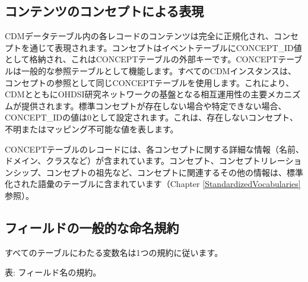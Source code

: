 \documentclass[
  11pt]{book}
\theoremstyle{definition}
\theoremstyle{definition}
\theoremstyle{definition}
\theoremstyle{definition}
\theoremstyle{remark}
\begin{document}
\subsection{コンテンツのコンセプトによる表現}\label{ux30b3ux30f3ux30c6ux30f3ux30c4ux306eux30b3ux30f3ux30bbux30d7ux30c8ux306bux3088ux308bux8868ux73fe}

CDMデータテーブル内の各レコードのコンテンツは完全に正規化され、コンセプトを通じて表現されます。コンセプトはイベントテーブルにCONCEPT\_ID値として格納され、これはCONCEPTテーブルの外部キーです。CONCEPTテーブルは一般的な参照テーブルとして機能します。すべてのCDMインスタンスは、コンセプトの参照として同じCONCEPTテーブルを使用します。これにより、CDMとともにOHDSI研究ネットワークの基盤となる相互運用性の主要メカニズムが提供されます。標準コンセプトが存在しない場合や特定できない場合、CONCEPT\_IDの値は0として設定されます。これは、存在しないコンセプト、不明またはマッピング不可能な値を表します。

CONCEPTテーブルのレコードには、各コンセプトに関する詳細な情報（名前、ドメイン、クラスなど）が含まれています。コンセプト、コンセプトリレーションシップ、コンセプトの祖先など、コンセプトに関連するその他の情報は、標準化された語彙のテーブルに含まれています（Chapter \ref{StandardizedVocabularies}参照）。

\subsection{フィールドの一般的な命名規約}\label{ux30d5ux30a3ux30fcux30ebux30c9ux306eux4e00ux822cux7684ux306aux547dux540dux898fux7d04}

すべてのテーブルにわたる変数名は1つの規約に従います。

表: \label{tab:fieldConventions} フィールド名の規約。
\end{document}
